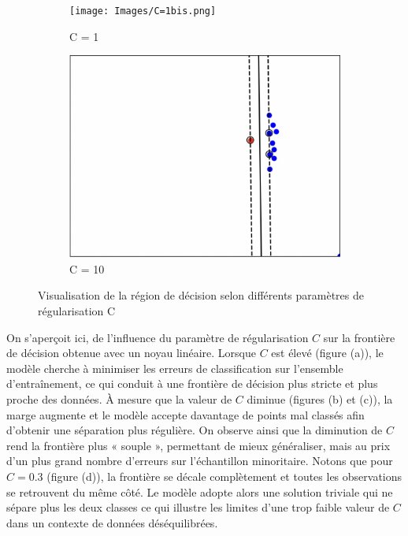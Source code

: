 \documentclass[a4paper,12pt]{article}
\begin{document}
\begin{figure}[H]
    \begin{subfigure}[b]{0.45\textwidth}
        \centering
        \texttt{[image: Images/C=1bis.png]}
        \caption{C = 1}
    \end{subfigure}
    \hfill
    \begin{subfigure}[b]{0.45\textwidth}
        \centering
        \includegraphics[width=\textwidth]{Images/C=10.png}
        \caption{C = 10}
    \end{subfigure}

    \caption{Visualisation de la région de décision selon différents paramètres de régularisation C}\label{fig : carre}
\end{figure}

On s'aperçoit ici, de l’influence du paramètre de régularisation $C$ sur la frontière de décision obtenue avec un noyau linéaire.  
Lorsque $C$ est élevé (figure (a)), le modèle cherche à minimiser les erreurs de classification sur l’ensemble d’entraînement, ce qui conduit à une frontière de décision plus stricte et plus proche des données. 
À mesure que la valeur de $C$ diminue (figures (b) et (c)), la marge augmente et le modèle accepte davantage de points mal classés afin d’obtenir une séparation plus régulière.  
On observe ainsi que la diminution de $C$ rend la frontière plus « souple », permettant de mieux généraliser, mais au prix d’un plus grand nombre d’erreurs sur l’échantillon minoritaire. 
Notons que pour $C = 0.3$ (figure (d)), la frontière se décale complètement et toutes les observations se retrouvent du même côté. 
Le modèle adopte alors une solution triviale qui ne sépare plus les deux classes ce qui illustre les limites d’une trop faible valeur de $C$ dans un contexte de données déséquilibrées.  
\end{document}
